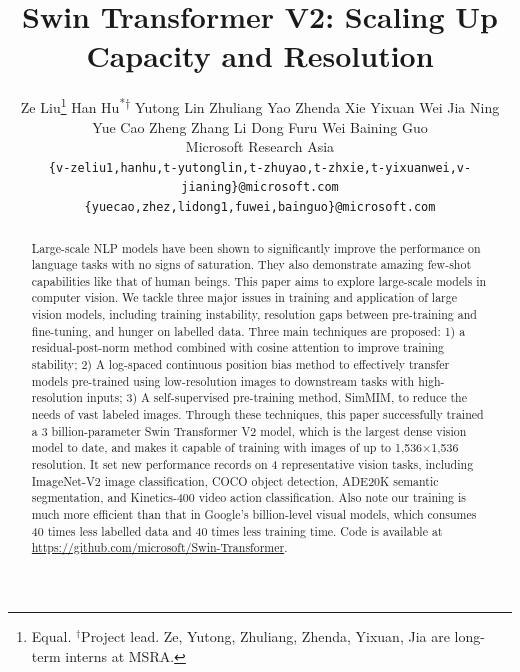 \documentclass[10pt,twocolumn,letterpaper]{article}
\begin{document}
\title{Swin Transformer V2: Scaling Up Capacity and Resolution}


\author{
Ze Liu\thanks{Equal. $^\dag$Project lead. Ze, Yutong, Zhuliang, Zhenda, Yixuan, Jia are long-term interns at MSRA.}
\quad Han Hu\textsuperscript{*$\dag$} \quad Yutong Lin \quad Zhuliang Yao \quad Zhenda Xie
\quad Yixuan Wei \quad Jia Ning  \\
\quad Yue Cao \quad Zheng Zhang
\quad Li Dong \quad Furu Wei \quad Baining Guo \\
{Microsoft Research Asia}\\
\small{\texttt{\{v-zeliu1,hanhu,t-yutonglin,t-zhuyao,t-zhxie,t-yixuanwei,v-jianing\}@microsoft.com}} \\
\small{\texttt{\{yuecao,zhez,lidong1,fuwei,bainguo\}@microsoft.com}}
}

\maketitle

\begin{abstract}

Large-scale NLP models have been shown to significantly improve the performance on language tasks with no signs of saturation. They also demonstrate amazing few-shot capabilities like that of human beings. This paper aims to explore large-scale models in computer vision. We tackle three major issues in training and application of large vision models, including training instability, resolution gaps between pre-training and fine-tuning, and hunger on labelled data. Three main techniques are proposed: 1) a residual-post-norm method combined with cosine attention to improve training stability; 2) A log-spaced continuous position bias method to effectively transfer models pre-trained using low-resolution images to downstream tasks with high-resolution inputs; 3) A self-supervised pre-training method, SimMIM, to reduce the needs of vast labeled images. Through these techniques, this paper successfully trained a 3 billion-parameter Swin Transformer V2 model, which is the largest dense vision model to date, and makes it capable of training with images of up to 1,536$\times$1,536 resolution. It set new performance records on 4 representative vision tasks, including ImageNet-V2 image classification, COCO object detection, ADE20K semantic segmentation, and Kinetics-400 video action classification. Also note our training is much more efficient than that in Google's billion-level visual models, which consumes 40 times less labelled data and 40 times less training time. Code is available at \url{https://github.com/microsoft/Swin-Transformer}.

\end{abstract}
\end{document}
